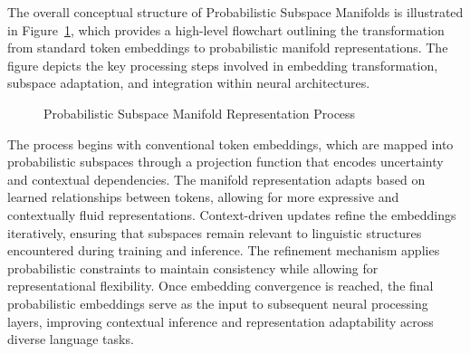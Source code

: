 \documentclass{article}
\begin{document}
The overall conceptual structure of Probabilistic Subspace Manifolds is illustrated in Figure~\ref{fig:psm_structure}, which provides a high-level flowchart outlining the transformation from standard token embeddings to probabilistic manifold representations. The figure depicts the key processing steps involved in embedding transformation, subspace adaptation, and integration within neural architectures.

\begin{figure}[ht]
	\centering
	\caption{Probabilistic Subspace Manifold Representation Process}
	\label{fig:psm_structure}
\end{figure}

The process begins with conventional token embeddings, which are mapped into probabilistic subspaces through a projection function that encodes uncertainty and contextual dependencies. The manifold representation adapts based on learned relationships between tokens, allowing for more expressive and contextually fluid representations. Context-driven updates refine the embeddings iteratively, ensuring that subspaces remain relevant to linguistic structures encountered during training and inference. The refinement mechanism applies probabilistic constraints to maintain consistency while allowing for representational flexibility. Once embedding convergence is reached, the final probabilistic embeddings serve as the input to subsequent neural processing layers, improving contextual inference and representation adaptability across diverse language tasks.
\end{document}
